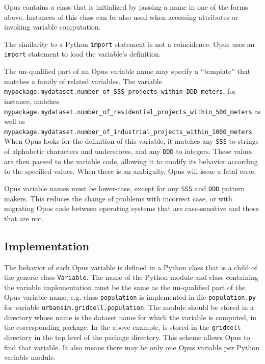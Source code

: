 {Opus contains a class  \variablesindex that is initialized by passing a
name in one of the forms above. Instances of this class can be also used when
accessing attributes \attributesindex or invoking variable \variablesindex computation.

The similarity to a Python \pythonindex \verb|import| statement is not a
coincidence: Opus uses an \verb|import| statement to load the variable's
\variablesindex definition.

The un-qualified part of an Opus variable \variablesindex name may specify
a ``template'' that matches a family of related variables. \variablesindex
The variable \variablesindex
\verb|mypackage.mydataset.number_of_SSS_projects_within_DDD_meters|, for
instance, matches
\verb|mypackage.mydataset.number_of_residential_projects_within_500_meters|
as well as
\verb|mypackage.mydataset.number_of_industrial_projects_within_1000_meters|.
When Opus looks for the definition of this variable, \variablesindex it
matches any \verb|SSS| to strings of alphabetic characters and underscores,
and any \verb|DDD| to integers. These values are then passed to the
variable \variablesindex code, allowing it to modify its behavior according
to the specified values. When there is an ambiguity, Opus will issue a
fatal error.

Opus variable \variablesindex names must be lower-case, except for any
\verb|SSS| and \verb|DDD| pattern makers.  This reduces the change of
problems with incorrect case, or with migrating Opus code between operating
systems that are case-sensitive and those that are not.

\subsection{Implementation}
\label{sec:variable-implementation}
%
The behavior of each Opus variable \variablesindex is defined in a Python \pythonindex class that is a
child of the generic class \verb|Variable|. \variablesindex The name of the Python \pythonindex module and
class containing the variable \variablesindex implementation must be the same as the
un-qualified part of the Opus variable \variablesindex name, e.g. class \verb|population| is
implemented in file \verb|population.py| for variable \variablesindex
\verb|urbansim.gridcell.population|. The module should be stored in a
directory whose name is the dataset \datasetindex name for which the variable \variablesindex is computed,
in the corresponding package. In the above example,  is
stored in the \verb|gridcell| directory in the top level of the
 package directory.  This scheme allows Opus to find that
variable. \variablesindex  It also means there may be only one Opus variable per Python \pythonindex
variable \variablesindex module.

}
